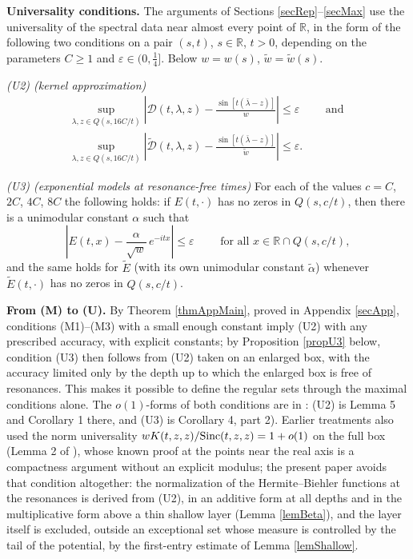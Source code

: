 \documentclass[11pt,twoside,reqno]{amsart}
\def\ti{\tilde}
\def\R{{\mathbb R}}
\def\e{\varepsilon}
\def\l{\lambda}
\def\a{\alpha}
\def\S{\text{\rm Sinc}}
\theoremstyle{plain}
\numberwithin{equation}{section}
\begin{document}
{\bf Universality conditions.} The arguments of Sections \ref{secRep}--\ref{secMax} use the universality of the spectral data near almost every point of $\R$, in the form of the following two conditions on a pair $(s,t)$, $s\in\R$, $t>0$, depending on the parameters $C\geq 1$ and $\e\in(0,\tfrac14]$. Below $w=w(s)$, $\ti w=\ti w(s)$.

{\it (U2) (kernel approximation)} 
$$\begin{gathered}
\sup_{\l,z\in Q(s,16C/t)}\left|{\mathcal D}(t,\l,z)-\frac{\sin[t(\bar\l-z)]}{w}\right|\leq\e
\qquad\text{ and }\\
\sup_{\l,z\in Q(s,16C/t)}\left|\ti{\mathcal D}(t,\l,z)-\frac{\sin[t(\bar\l-z)]}{\ti w}\right|\leq\e .
\end{gathered}$$

{\it (U3) (exponential models at resonance-free times)} For each of the values $c=C$, $2C$, $4C$, $8C$ the following holds: if $E(t,\cdot)$ has no zeros in $Q(s,c/t)$, then there is a unimodular constant $\a$ such that
$$\left|E(t,x)-\frac{\a}{\sqrt w}\,e^{-itx}\right|\leq\e\qquad\text{ for all }x\in\R\cap Q(s,c/t),$$
and the same holds for $\ti E$ (with its own unimodular constant $\ti\a$) whenever $\ti E(t,\cdot)$ has no zeros in $Q(s,c/t)$.

{\bf From (M) to (U).} By Theorem \ref{thmAppMain}, proved in Appendix \ref{secApp}, conditions (M1)--(M3) with a small enough constant imply (U2) with any prescribed accuracy, with explicit constants; by Proposition \ref{propU3} below, condition (U3) then follows from (U2) taken on an enlarged box, with the accuracy limited only by the depth up to which the enlarged box is free of resonances. This makes it possible to define the regular sets through the maximal conditions alone. The $o(1)$-forms of both conditions are in \cite{Scatter}: (U2) is Lemma 5 and Corollary 1 there, and (U3) is Corollary 4, part 2). Earlier treatments also used the norm universality $wK(t,z,z)/\S(t,z,z)=1+o(1)$ on the full box (Lemma 2 of \cite{Scatter}), whose known proof at the points near the real axis is a compactness argument without an explicit modulus; the present paper avoids that condition altogether: the normalization of the Hermite--Biehler functions at the resonances is derived from (U2), in an additive form at all depths and in the multiplicative form above a thin shallow layer (Lemma \ref{lemBeta}), and the layer itself is excluded, outside an exceptional set whose measure is controlled by the tail of the potential, by the first-entry estimate of Lemma \ref{lemShallow}.
\end{document}
